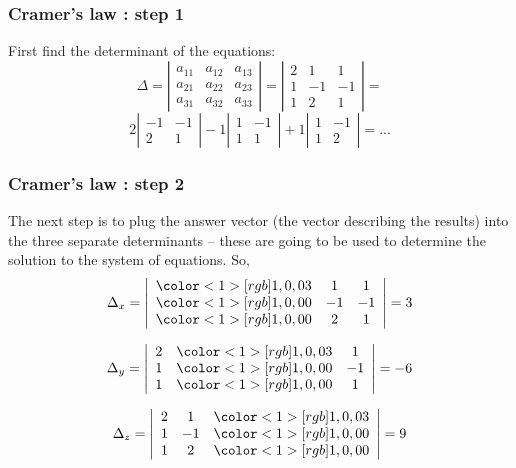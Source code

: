 \documentclass{beamer}
\begin{document}
\begin{frame}
\frametitle{Cramer's law : step 1}

First find the determinant of the equations:
$$ \Delta =  \left| \begin{array}{ccc}
a_{11} & a_{12} & a_{13} \\
a_{21} & a_{22} & a_{23} \\
a_{31} & a_{32} & a_{33} \end{array} \right| = 
\left| \begin{array}{ccc}
2 & 1& 1  \\
1 & -1 & -1 \\
1 & 2 & 1 \end{array} \right| = 
$$
$$ 2 
\left| \begin{array}{cc}
-1 & -1  \\
2 & 1 \end{array} \right| 
 - 1
\left| \begin{array}{cc}
1 & -1 \\
1 & 1 \end{array} \right| + 1
\left| \begin{array}{cc}
1& -1 \\
1 & 2 \end{array} \right| = ...
$$
%
\end{frame}

\begin{frame}
\frametitle{Cramer's law : step 2}
The next step is to plug the answer vector (the vector describing the results) into the three separate determinants -- these are going to be used to determine the solution to the system of equations.
So,
$$\Delta_{x} = 
\left| \begin{array}{ccc}
{\color<1>[rgb]{1,0,0}{3}}  & 1& 1  \\
{\color<1>[rgb]{1,0,0}{0}}  & -1 & -1 \\
{\color<1>[rgb]{1,0,0}{0}}  & 2 & 1 \end{array} \right| = 3
$$

$$\Delta_{y} = 
\left| \begin{array}{ccc}
2 & {\color<1>[rgb]{1,0,0}{3}}  & 1  \\
1 & {\color<1>[rgb]{1,0,0}{0}}  & -1 \\
1 & {\color<1>[rgb]{1,0,0}{0}}  & 1 \end{array} \right| = -6
$$

$$\Delta_{z} = 
\left| \begin{array}{ccc}
2 & 1  & {\color<1>[rgb]{1,0,0}{3}}\\
1 & -1 & {\color<1>[rgb]{1,0,0}{0}}\\
1 & 2  & {\color<1>[rgb]{1,0,0}{0}}\end{array} \right| = 9
$$

\end{frame}
\end{document}
